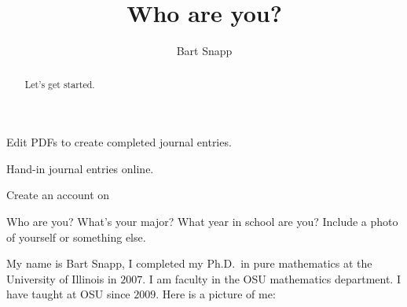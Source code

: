 \documentclass[nooutcomes,noauthor]{ximera}
\title{Who are you?}
\author{Bart Snapp}
\begin{document}
\begin{abstract}
  Let's get started.
\end{abstract}
\maketitle

\begin{listOutcomes}
\item{Edit PDFs to create completed journal entries.}
\item{Hand-in journal entries online.}
\item{Create an account on \snap}
\end{listOutcomes}
\mynewpage

\begin{question}
  Who are you? What's your major? What year in school are you? Include a photo of yourself or something else.
  \begin{freeResponse}
    My name is Bart Snapp, I completed my Ph.D.\ in pure mathematics
    at the University of Illinois in $2007$.  I am faculty in the OSU
    mathematics department. I have taught at OSU since $2009$. Here is
    a picture of me:
    \begin{center}

\end{center}
\end{freeResponse}
\end{question}
\end{document}
